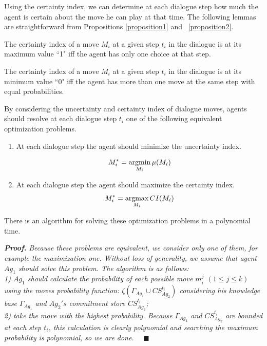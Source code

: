Using the certainty index, we can determine at each dialogue step how much the agent is certain about the move
he can play at that time. The following lemmas are straightforward from Propositions
\ref{proposition1} and ~\ref{proposition2}.

\begin{lemma}\label{lemma1}
The certainty index of a move $M_i$ at a given step $t_i$ in the dialogue is at its maximum value ``1" iff the agent
has only one choice at that step.
\end{lemma}

\begin{lemma}\label{lemma2}
The certainty index of a move $M_i$ at a given step $t_i$ in the dialogue is at its minimum value ``0" iff the agent
has more than one move at the same step with equal probabilities.
\end{lemma}

By considering the uncertainty and certainty index of dialogue moves, agents should resolve at each dialogue step
$t_i$ one of the following equivalent optimization problems.
\begin{enumerate}
  \item  At each dialogue step the agent should minimize the uncertainty index.

    \begin{equation}\label{equation8}
    M_i^* = \underset{\small{M_i}}{\operatorname{argmin}} \, \mu(M_i)
    \end{equation}
  \item  At each dialogue step the agent should maximize the certainty index.
   \begin{equation}\label{equation9}
   M_i^* = \underset{\small{M_i}}{\operatorname{argmax}} \, CI(M_i)
 \end{equation}

\end{enumerate}

\begin{theorem}
There is an algorithm for solving these optimization problems in a polynomial time.
\end{theorem}

\noindent\emph{\textbf{Proof.}} \emph{
Because these problems are equivalent, we consider only one of them, for example the maximization one.
Without loss of generality, we assume that agent $Ag_1$ should solve this problem. The algorithm is as follows:\\
1) $Ag_1$ should calculate the probability of each possible move $m_i^j$ $(1 \leq j \leq k)$ using the \emph{moves probability function}:
 $\zeta(\Gamma_{Ag_1} \cup CS_{Ag_2}^{t_i})$ considering his knowledge base $\Gamma_{Ag_1}$ and $Ag_2's$ commitment store $CS_{Ag_2}^{t_i}$; \\
2) take the move with the highest probability. Because $\Gamma_{Ag_1}$ and $CS_{Ag_2}^{t_i}$ are bounded at each step
$t_i$, this calculation is clearly polynomial and searching the maximum probability is polynomial, so we are done.}
~~$\blacksquare$


